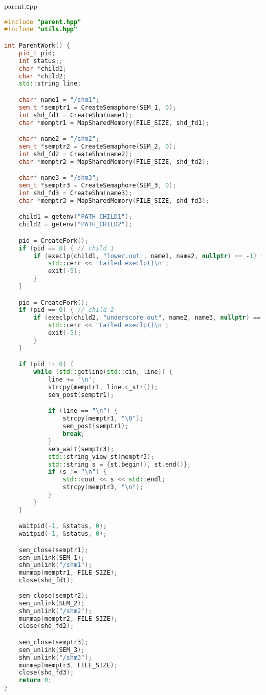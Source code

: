 \documentclass[a4paper, 12pt]{article}
\begin{document}
parent.сpp
\begin{lstlisting}[language=C++]
#include "parent.hpp"
#include "utils.hpp"

int ParentWork() {
    pid_t pid;
    int status;;
    char *child1;
    char *child2;
    std::string line;

    char* name1 = "/shm1";
    sem_t *semptr1 = CreateSemaphore(SEM_1, 0);
    int shd_fd1 = CreateShm(name1);
    char *memptr1 = MapSharedMemory(FILE_SIZE, shd_fd1);

    char* name2 = "/shm2";
    sem_t *semptr2 = CreateSemaphore(SEM_2, 0);
    int shd_fd2 = CreateShm(name2);
    char *memptr2 = MapSharedMemory(FILE_SIZE, shd_fd2);

    char* name3 = "/shm3";
    sem_t *semptr3 = CreateSemaphore(SEM_3, 0);
    int shd_fd3 = CreateShm(name3);
    char *memptr3 = MapSharedMemory(FILE_SIZE, shd_fd3);

    child1 = getenv("PATH_CHILD1");
    child2 = getenv("PATH_CHILD2");

    pid = CreateFork();
    if (pid == 0) { // child 1
        if (execlp(child1, "lower.out", name1, name2, nullptr) == -1) {
            std::cerr << "Failed execlp()\n";
            exit(-5);
        }
    }

    pid = CreateFork();
    if (pid == 0) { // child 2
        if (execlp(child2, "underscore.out", name2, name3, nullptr) == -1) {
            std::cerr << "Failed execlp()\n";
            exit(-5);
        }
    }

    if (pid != 0) {
        while (std::getline(std::cin, line)) {
            line += '\n';
            strcpy(memptr1, line.c_str());
            sem_post(semptr1);

            if (line == "\n") {
                strcpy(memptr1, "\0");
                sem_post(semptr1);
                break;
            }
            sem_wait(semptr3);
            std::string_view st(memptr3);
            std::string s = {st.begin(), st.end()};
            if (s != "\n") {
                std::cout << s << std::endl;
                strcpy(memptr3, "\n");
            }
        }
    }

    waitpid(-1, &status, 0);
    waitpid(-1, &status, 0);

    sem_close(semptr1);
    sem_unlink(SEM_1);
    shm_unlink("/shm1");
    munmap(memptr1, FILE_SIZE);
    close(shd_fd1);
    
    sem_close(semptr2);
    sem_unlink(SEM_2);
    shm_unlink("/shm2");
    munmap(memptr2, FILE_SIZE);
    close(shd_fd2);

    sem_close(semptr3);
    sem_unlink(SEM_3);
    shm_unlink("/shm3");
    munmap(memptr3, FILE_SIZE);
    close(shd_fd3);
    return 0;
}

\end{lstlisting}
\end{document}
